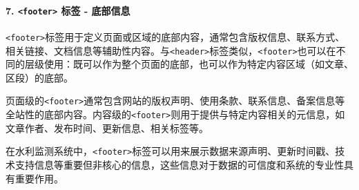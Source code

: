 \paragraph{\texorpdfstring{7. \texttt{\textless{}footer\textgreater{}} 标签 - 底部信息}{7. \textless footer\textgreater{} 标签 - 底部信息}}\label{footer-ux6807ux7b7e---ux5e95ux90e8ux4fe1ux606f}

\texttt{\textless{}footer\textgreater{}}标签用于定义页面或区域的底部内容，通常包含版权信息、联系方式、相关链接、文档信息等辅助性内容。与\texttt{\textless{}header\textgreater{}}标签类似，\texttt{\textless{}footer\textgreater{}}也可以在不同的层级使用：既可以作为整个页面的底部，也可以作为特定内容区域（如文章、区段）的底部。

页面级的\texttt{\textless{}footer\textgreater{}}通常包含网站的版权声明、使用条款、联系信息、备案信息等全站性的底部内容。内容级的\texttt{\textless{}footer\textgreater{}}则用于提供与特定内容相关的元信息，如文章作者、发布时间、更新信息、相关标签等。

在水利监测系统中，\texttt{\textless{}footer\textgreater{}}标签可以用来展示数据来源声明、更新时间戳、技术支持信息等重要但非核心的信息，这些信息对于数据的可信度和系统的专业性具有重要作用。

